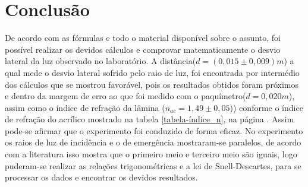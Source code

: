 \documentclass[
	12pt,				%
	oneside,			%
	a4paper,			%
	english,			%
	french,				%
	spanish,			%
	brazil				%
	]{abntex2}
\begin{document}
\newpage



\chapter{Conclusão}
De acordo com as fórmulas e todo o material disponível sobre o assunto, foi possível realizar os devidos cálculos e comprovar matematicamente o desvio lateral da luz observado no laboratório. A distância($d = (0,015 \pm 0,009)m$) a qual mede o desvio lateral sofrido pelo raio de luz, foi encontrada por intermédio dos cálculos que se mostrou favorável, pois os resultados obtidos foram próximos e dentro da margem de erro ao que foi medido com o paquímetro($d = 0,020m$), assim como o índice de refração da lâmina ($n_{ac} = 1,49 \pm 0,05$)) conforme o índice de refração do acrílico mostrado na tabela \ref{tabela-índice_n}, na página \pageref{tabela-índice_n}. Assim pode-se afirmar que o experimento foi conduzido de forma eficaz. No experimento os raios de luz de incidência e o de emergência mostraram-se paralelos, de acordo com a literatura isso mostra que o primeiro meio e terceiro meio são iguais, logo puderam-se realizar as relações trigonométricas e a lei de Snell-Descartes, para se processar os dados e encontrar os devidos resultados.

\postextual


\end{document}
